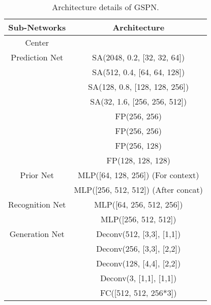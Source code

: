 \documentclass[10pt,twocolumn,letterpaper]{article}
\begin{document}
\begin{table}[h]
    \centering
    \begin{tabular}{c|c}
    \toprule
        Sub-Networks & Architecture \\
    \midrule
        Center \\Prediction Net & SA(2048, 0.2, [32, 32, 64])  \\
        & SA(512, 0.4, [64, 64, 128]) \\
        & SA(128, 0.8, [128, 128, 256]) \\
        & SA(32, 1.6, [256, 256, 512]) \\
        & FP(256, 256) \\
        & FP(256, 256) \\
        & FP(256, 128) \\
        & FP(128, 128, 128) \\
        \midrule
        Prior Net & MLP([64, 128, 256]) (For context) \\
        & MLP([256, 512, 512])  (After concat)\\
        \midrule
        Recognition Net & MLP([64, 256, 512, 256])  \\
        & MLP([256, 512, 512]) \\
        \midrule
        Generation Net & Deconv(512, [3,3], [1,1]) \\
        & Deconv(256, [3,3], [2,2]) \\
        & Deconv(128, [4,4], [2,2]) \\
        & Deconv(3, [1,1], [1,1]) \\
        & FC([512, 512, 256*3]) \\
    \bottomrule 
    \end{tabular}
    \caption{Architecture details of GSPN.}
    \label{tab:gspn_net}
\end{table}
\end{document}
